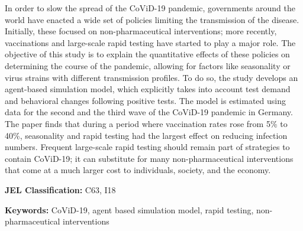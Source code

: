 \noindent
In order to slow the spread of the CoViD-19 pandemic, governments around the world have
enacted a wide set of policies limiting the transmission of the disease. Initially,
these focused on non-pharmaceutical interventions; more recently, vaccinations and
large-scale rapid testing have started to play a major role. The objective of this study
is to explain the quantitative effects of these policies on determining the course of
the pandemic, allowing for factors like seasonality or virus strains with different
transmission profiles. To do so, the study develops an agent-based simulation model,
which explicitly takes into account test demand and behavioral changes following
positive tests. The model is estimated using data for the second and the third wave of the
CoViD-19 pandemic in Germany. The paper finds that during a period where vaccination
rates rose from 5\% to 40\%, seasonality and rapid testing had the largest effect on
reducing infection numbers. Frequent large-scale rapid testing should remain part of
strategies to contain CoViD-19; it can substitute for many non-pharmaceutical
interventions that come at a much larger cost to individuals, society, and the economy.

\vspace{1cm}
\noindent \textbf{JEL Classification:} C63, I18

\noindent \textbf{Keywords:} CoViD-19, agent based simulation model, rapid testing,
non-pharmaceutical interventions